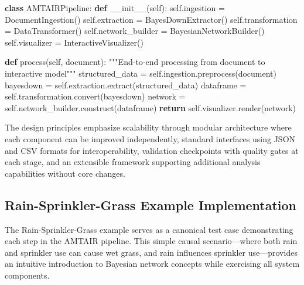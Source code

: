 \documentclass[
  11pt,
  letterpaper,
]{book}
\newenvironment{Shaded}{\begin{snugshade}}{\end{snugshade}}
\newcommand{\CommentTok}[1]{\textcolor[rgb]{0.37,0.37,0.37}{#1}}
\newcommand{\ControlFlowTok}[1]{\textcolor[rgb]{0.00,0.23,0.31}{\textbf{#1}}}
\newcommand{\FunctionTok}[1]{\textcolor[rgb]{0.28,0.35,0.67}{#1}}
\newcommand{\KeywordTok}[1]{\textcolor[rgb]{0.00,0.23,0.31}{\textbf{#1}}}
\newcommand{\NormalTok}[1]{\textcolor[rgb]{0.00,0.23,0.31}{#1}}
\newcommand{\OperatorTok}[1]{\textcolor[rgb]{0.37,0.37,0.37}{#1}}
\newcommand{\VariableTok}[1]{\textcolor[rgb]{0.07,0.07,0.07}{#1}}
\begin{document}
\begin{Shaded}
\begin{Highlighting}[]
\KeywordTok{class}\NormalTok{ AMTAIRPipeline:}
    \KeywordTok{def} \FunctionTok{\_\_init\_\_}\NormalTok{(}\VariableTok{self}\NormalTok{):}
        \VariableTok{self}\NormalTok{.ingestion }\OperatorTok{=}\NormalTok{ DocumentIngestion()}
        \VariableTok{self}\NormalTok{.extraction }\OperatorTok{=}\NormalTok{ BayesDownExtractor() }
        \VariableTok{self}\NormalTok{.transformation }\OperatorTok{=}\NormalTok{ DataTransformer()}
        \VariableTok{self}\NormalTok{.network\_builder }\OperatorTok{=}\NormalTok{ BayesianNetworkBuilder()}
        \VariableTok{self}\NormalTok{.visualizer }\OperatorTok{=}\NormalTok{ InteractiveVisualizer()}
    
    \KeywordTok{def}\NormalTok{ process(}\VariableTok{self}\NormalTok{, document):}
        \CommentTok{"""End{-}to{-}end processing from document to interactive model"""}
\NormalTok{        structured\_data }\OperatorTok{=} \VariableTok{self}\NormalTok{.ingestion.preprocess(document)}
\NormalTok{        bayesdown }\OperatorTok{=} \VariableTok{self}\NormalTok{.extraction.extract(structured\_data)}
\NormalTok{        dataframe }\OperatorTok{=} \VariableTok{self}\NormalTok{.transformation.convert(bayesdown)}
\NormalTok{        network }\OperatorTok{=} \VariableTok{self}\NormalTok{.network\_builder.construct(dataframe)}
        \ControlFlowTok{return} \VariableTok{self}\NormalTok{.visualizer.render(network)}
\end{Highlighting}
\end{Shaded}

The design principles emphasize scalability through modular architecture
where each component can be improved independently, standard interfaces
using JSON and CSV formats for interoperability, validation checkpoints
with quality gates at each stage, and an extensible framework supporting
additional analysis capabilities without core changes.

\subsection{Rain-Sprinkler-Grass Example
Implementation}\label{sec-rain-sprinkler-grass}

The Rain-Sprinkler-Grass example serves as a canonical test case
demonstrating each step in the AMTAIR pipeline. This simple causal
scenario---where both rain and sprinkler use can cause wet grass, and
rain influences sprinkler use---provides an intuitive introduction to
Bayesian network concepts while exercising all system components.
\end{document}
